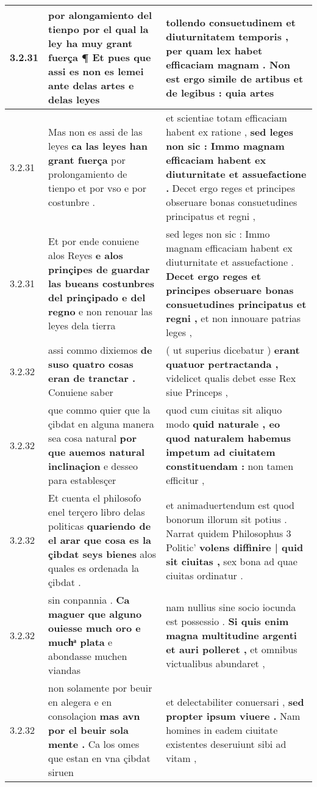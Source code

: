 \begin{tabular}{|p{1cm}|p{6.5cm}|p{6.5cm}|}
3.2.31 & por alongamiento del tienpo \textbf{ por el qual la ley ha muy grant fuerça ¶ } Et pues que assi es non es lemei ante delas artes e delas leyes & tollendo consuetudinem et diuturnitatem temporis , \textbf{ per quam lex habet efficaciam magnam . Non est ergo simile de artibus et de legibus : } quia artes \\\hline
3.2.31 & Mas non es assi de las leyes \textbf{ ca las leyes han grant fuerça } por prolongamiento de tienpo et por vso e por costunbre . & et scientiae totam efficaciam habent ex ratione , \textbf{ sed leges non sic : Immo magnam efficaciam habent ex diuturnitate et assuefactione . } Decet ergo reges et principes obseruare bonas consuetudines principatus et regni , \\\hline
3.2.31 & Et por ende conuiene alos Reyes \textbf{ e alos prinçipes de guardar las bueans costunbres del prinçipado e del regno } e non renouar las leyes dela tierra & sed leges non sic : Immo magnam efficaciam habent ex diuturnitate et assuefactione . \textbf{ Decet ergo reges et principes obseruare bonas consuetudines principatus et regni , } et non innouare patrias leges , \\\hline
3.2.32 & assi commo dixiemos \textbf{ de suso quatro cosas eran de tranctar . } Conuiene saber & ( ut superius dicebatur ) \textbf{ erant quatuor pertractanda , } videlicet qualis debet esse Rex siue Princeps , \\\hline
3.2.32 & que commo quier que la çibdat en alguna manera sea cosa natural \textbf{ por que auemos natural inclinaçion } e desseo para establesçer & quod cum ciuitas sit aliquo modo \textbf{ quid naturale , eo quod naturalem habemus impetum ad ciuitatem constituendam : } non tamen efficitur , \\\hline
3.2.32 & Et cuenta el philosofo enel terçero libro delas politicas \textbf{ quariendo de el arar que cosa es la çibdat seys bienes } alos quales es ordenada la çibdat . & et animaduertendum est quod bonorum illorum sit potius . Narrat quidem Philosophus 3 Politic’ \textbf{ volens diffinire | quid sit ciuitas , } sex bona ad quae ciuitas ordinatur . \\\hline
3.2.32 & sin conpannia . \textbf{ Ca maguer que alguno ouiesse much oro e muchͣ plata } e abondasse muchen viandas & nam nullius sine socio iocunda est possessio . \textbf{ Si quis enim magna multitudine argenti et auri polleret , } et omnibus victualibus abundaret , \\\hline
3.2.32 & non solamente por beuir en alegera e en consolaçion \textbf{ mas avn por el beuir sola mente . } Ca los omes que estan en vna çibdat siruen & et delectabiliter conuersari , \textbf{ sed propter ipsum viuere . } Nam homines in eadem ciuitate existentes deseruiunt sibi ad vitam , \\\hline

\end{tabular}
